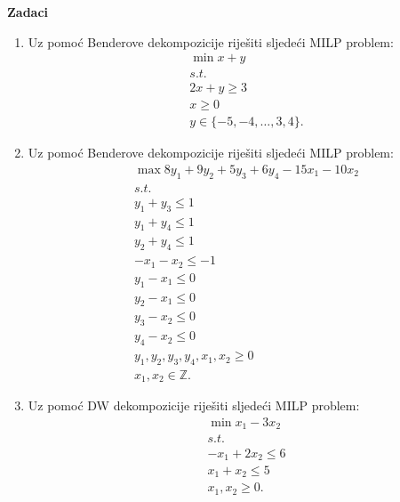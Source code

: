 \documentclass[a4paper, utf8, 11pt, colorlinks]{book}
\begin{document}
\textbf{Zadaci}
\begin{enumerate}
	\item %
	  	Uz pomoć Benderove dekompozicije riješiti sljedeći MILP problem:
	  \begin{align*}
	  	   &\min x + y \\
	  	   &s.t. \\
	  	   & 2x + y \geq 3 \\
	  	   & x \geq 0 \\
	  	   & y \in \{-5, -4,\ldots, 3, 4\}.
   	  \end{align*}
	\item %
	Uz pomoć Benderove dekompozicije riješiti sljedeći MILP problem:
	\begin{align*}
		 &\max 8 y_1 + 9 y_2 + 5 y_3 + 6 y_4 - 15 x_1 - 10 x_2 \\
		 & s.t.\\
		 &y_1 + y_3 \leq 1 \\
		 & y_1 + y_4 \leq 1 \\
		 &y_2 + y_4 \leq 1 \\
		 & -x_1-x_2 \leq -1 \\
		 & y_1 - x_1 \leq 0 \\
		 & y_2 - x_1 \leq 0 \\
		 & y_3 - x_2 \leq 0 \\
		 & y_4 - x_2 \leq 0 \\
		 & y_1,y_2,y_3,y_4,x_1, x_2 \geq 0 \\
		 & x_1, x_2 \in \mathbb{Z}.
	\end{align*}
\item %
Uz pomoć DW dekompozicije riješiti sljedeći MILP problem:
\begin{align*}
	&\min x_1 - 3 x_2 \\
	& s.t. \\
	& -x_1 + 2x_2 \leq 6 \\
	& x_1 + x_2 \leq 5 \\
	& x_1, x_2 \geq 0.
\end{align*}


\end{enumerate}
\end{document}
